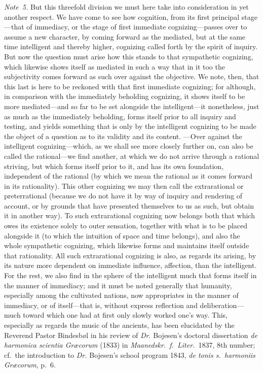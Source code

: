 \documentclass[12pt,a4paper]{book}
\begin{document}
{\small\emph{Note~5.} But this threefold division we must here take into
consideration in yet another respect. We have come to see how cognition, from its
first principal stage---that of immediacy, or the stage of first immediate
cognizing---passes over to assume a new character, by coming forward as the
mediated, but at the same time intelligent and thereby higher, cognizing called
forth by the spirit of inquiry. But now the question must arise how this stands to
that sympathetic cognizing, which likewise shows itself as mediated in such a way
that in it too the subjectivity comes forward as such over against the objective.
We note, then, that this last is here to be reckoned with that first immediate
cognizing; for although, in comparison with the immediately beholding cognizing,
it shows itself to be more mediated---and so far to be set alongside the
intelligent---it nonetheless, just as much as the immediately beholding, forms
itself prior to all inquiry and testing, and yields something that is only by the
intelligent cognizing to be made the object of a question as to its validity and
its content. ---Over against the intelligent cognizing---which, as we shall see
more closely further on, can also be called the rational---we find another, at
which we do not arrive through a rational striving, but which forms itself prior
to it, and has its own foundation, independent of the rational (by which we mean
the rational as it comes forward in its rationality). This other cognizing we may
then call the extrarational or preterrational (because we do not have it by way of
inquiry and rendering of account, or by grounds that have presented themselves to
us as such, but obtain it in another way). To such extrarational cognizing now
belongs both that which owes its existence solely to outer sensation, together
with what is to be placed alongside it (to which the intuition of space and time
belongs), and also the whole sympathetic cognizing, which likewise forms and
maintains itself outside that rationality. All such extrarational cognizing is
also, as regards its arising, by its nature more dependent on immediate influence,
affection, than the intelligent. For the rest, we also find in the sphere of the
intelligent much that forms itself in the manner of immediacy; and it must be
noted generally that humanity, especially among the cultivated nations, now
appropriates in the manner of immediacy, or of itself---that is, without express
reflection and deliberation---much toward which one had at first only slowly
worked one's way. This, especially as regards the music of the ancients, has been
elucidated by the Reverend Pastor Bindesbøl in his review of \emph{Dr.} Bojesen's
doctoral dissertation \textit{de harmonica scientia Græcorum} (1833) in
\textit{Maanedskr.\ f.\ Liter.}\ 1837, 8th number; cf.\ the introduction to
\emph{Dr.} Bojesen's school program 1843, \textit{de tonis s.\ harmoniis
Græcorum}, p.~6.\par}
\end{document}
